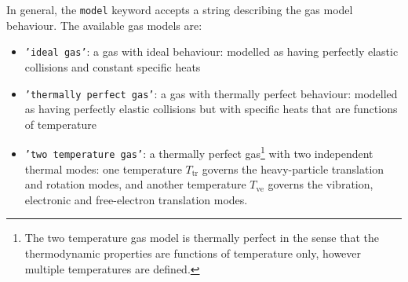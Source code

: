 \documentclass[12pt,a4paper,twoside]{article}
\begin{document}
\medskip
In general, the \texttt{model} keyword accepts a string describing
the gas model behaviour.
The available gas models are:
\begin{itemize}
 \item \texttt{'ideal gas'}: a gas with ideal behaviour: modelled as having perfectly elastic collisions
                             and constant specific heats
 \item \texttt{'thermally perfect gas'}: a gas with thermally perfect behaviour: modelled as having perfectly
                             elastic collisions but with specific heats that are functions of temperature
 \item \texttt{'two temperature gas'}: a thermally perfect gas\footnote{The two temperature gas model is thermally
                             perfect in the sense that the thermodynamic properties are functions
                             of temperature only, however multiple temperatures are defined.} with two independent
                             thermal modes: one temperature $T_\text{tr}$ governs the heavy-particle translation 
                             and rotation modes, and another temperature $T_\text{ve}$ governs the vibration, 
                             electronic and free-electron translation modes.

\end{itemize}
\end{document}
